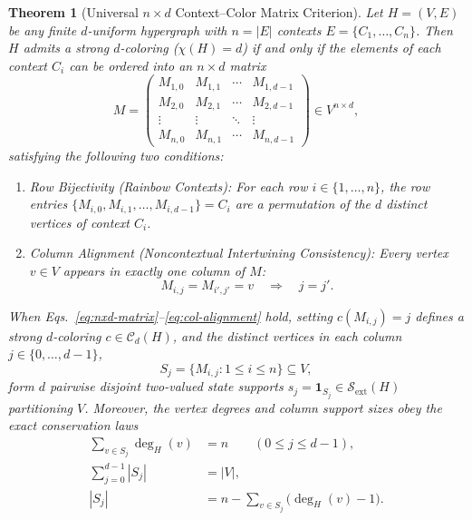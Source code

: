 \documentclass[aps,pra,reprint,superscriptaddress,longbibliography,nofootinbib,floatfix,10pt]{revtex4-2}
\newtheorem{theorem}{Theorem}
\theoremstyle{definition}\newtheorem{definition}[theorem]{Definition}
\theoremstyle{remark}\newtheorem{remark}[theorem]{Remark}
\newcommand{\Sc}{\mathcal S}\newcommand{\Cc}{\mathcal C}
\begin{document}
\begin{theorem}[Universal $n\times d$ Context--Color Matrix Criterion]\label{thm:nxd-matrix}
Let $H=(V,E)$ be any finite $d$-uniform hypergraph with $n=|E|$ contexts $E=\{C_1,\ldots,C_n\}$. Then $H$ admits a strong $d$-coloring ($\chi(H)=d$) if and only if the elements of each context $C_i$ can be ordered into an $n\times d$ matrix
\begin{equation}\label{eq:nxd-matrix}
M=\begin{pmatrix}
M_{1,0} & M_{1,1} & \cdots & M_{1,d-1}\\
M_{2,0} & M_{2,1} & \cdots & M_{2,d-1}\\
\vdots  & \vdots  & \ddots & \vdots\\
M_{n,0} & M_{n,1} & \cdots & M_{n,d-1}
\end{pmatrix}\in V^{n\times d},
\end{equation}
satisfying the following two conditions:
\begin{enumerate}
\item \emph{Row Bijectivity (Rainbow Contexts):} For each row $i\in\{1,\ldots,n\}$, the row entries $\{M_{i,0},M_{i,1},\ldots,M_{i,d-1}\}=C_i$ are a permutation of the $d$ distinct vertices of context $C_i$.
\item \emph{Column Alignment (Noncontextual Intertwining Consistency):} Every vertex $v\in V$ appears in \emph{exactly one column} of $M$:
\begin{equation}\label{eq:col-alignment}
M_{i,j}=M_{i',j'}=v \quad\Longrightarrow\quad j=j'.
\end{equation}
\end{enumerate}
When Eqs.~\eqref{eq:nxd-matrix}--\eqref{eq:col-alignment} hold, setting $c(M_{i,j})=j$ defines a strong $d$-coloring $c\in\Cc_d(H)$, and the distinct vertices in each column $j\in\{0,\ldots,d-1\}$,
\begin{equation}\label{eq:col-state}
S_j=\{M_{i,j}:1\le i\le n\}\subseteq V,
\end{equation}
form $d$ pairwise disjoint two-valued state supports $s_j=\mathbf{1}_{S_j}\in\Sc_{\mathrm{ext}}(H)$ partitioning $V$. Moreover, the vertex degrees and column support sizes obey the exact conservation laws
\begin{align}
\sum_{v\in S_j}\deg_H(v) &= n \qquad (0\le j\le d-1),\label{eq:deg-conservation}\\
\sum_{j=0}^{d-1}|S_j| &= |V|,\label{eq:size-conservation}\\
|S_j| &= n - \sum_{v\in S_j}\bigl(\deg_H(v)-1\bigr).\label{eq:hinge-saving}
\end{align}
\end{theorem}
\end{document}
